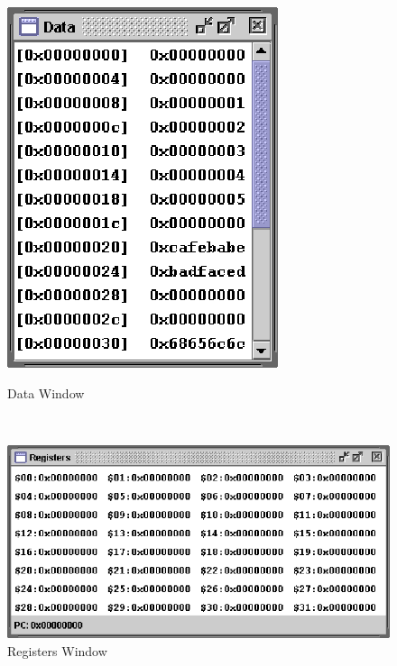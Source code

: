 \documentclass[]{spie}
\begin{document}
\begin{center}
\begin{figure}[H]	
	\begin{center}
	\begin{minipage}{2.4in}
		\begin{center}
			\includegraphics{graphics/DataWindow.eps}			
		\end{center}		
		\caption{\label{fig:Data} Data Window}	
	\end{minipage}
	\ 	
	\begin{minipage}{2.7in}
		\begin{center}
			\includegraphics{graphics/RegistersWindow.eps}			
		\end{center}
		\vspace{17pt}
		\caption{\label{fig:Registers}Registers Window}
	\end{minipage}	
	\end{center}	
\end{figure}
\end{center}
\end{document}
